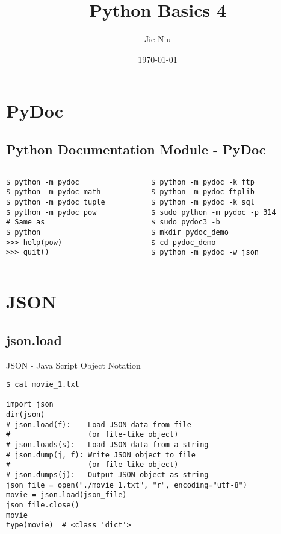 \documentclass{beamer}
\title{Python Basics 4}
\author{Jie Niu}
\institute{IGWES, JNU}
\date{\today}
\begin{document}
\begin{frame}
\titlepage
\end{frame}

\section{PyDoc}
\subsection{Python Documentation Module - PyDoc}

\begin{frame}[fragile]
\begin{columns}
\begin{column}{.5\textwidth}
\begin{verbatim}
$ python -m pydoc
$ python -m pydoc math
$ python -m pydoc tuple
$ python -m pydoc pow
# Same as
$ python
>>> help(pow)
>>> quit()
\end{verbatim}
\end{column}
\begin{column}{.5\textwidth}
\begin{verbatim}
$ python -m pydoc -k ftp
$ python -m pydoc ftplib
$ python -m pydoc -k sql
$ sudo python -m pydoc -p 314
$ sudo pydoc3 -b
$ mkdir pydoc_demo
$ cd pydoc_demo
$ python -m pydoc -w json
\end{verbatim}
\end{column}
\end{columns}
\end{frame}

\section{JSON}
\subsection{json.load}

\begin{frame}[fragile]{JSON - Java Script Object Notation}
\begin{verbatim}
$ cat movie_1.txt

import json
dir(json)
# json.load(f):    Load JSON data from file
#                  (or file-like object)
# json.loads(s):   Load JSON data from a string
# json.dump(j, f): Write JSON object to file
#                  (or file-like object)
# json.dumps(j):   Output JSON object as string
json_file = open("./movie_1.txt", "r", encoding="utf-8")
movie = json.load(json_file)
json_file.close()
movie
type(movie)  # <class 'dict'>
\end{verbatim}
\end{frame}
\end{document}
